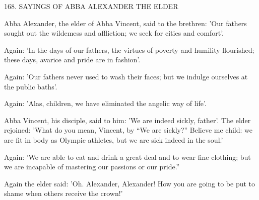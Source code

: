168.
SAYINGS OF ABBA ALEXANDER THE ELDER

Abba Alexander, the elder of Abba Vincent, said to the brethren:
'Our fathers sought out the wildemess and affliction; we seek for
cities and comfort'.

Again: 'In the days of our fathers, the virtues of poverty and
humility flourished; these days, avarice and pride are in fashion'.

Again: 'Our fathers never used to wash their faces; but we
indulge ourselves at the public baths'.

Again: 'Alas, children, we have eliminated the angelic way of
life'.

Abba Vincent, his disciple, said to him: 'We are indeed sickly,
father'.
The elder rejoined: 'What do you mean, Vincent, by “We
are sickly?” Believe me child: we are fit in body as Olympic athletes,
but we are sick indeed in the soul.'

Again: 'We are able to eat and drink a great deal and to wear
fine clothing; but we are incapable of mastering our passions or our
pride.”

Again the elder said: 'Oh.
Alexander, Alexander! How you are
going to be put to shame when others receive the crown!'

